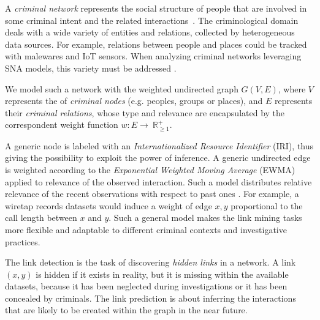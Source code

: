 

A \textit{criminal network} represents the social structure of people that are involved in some criminal intent and the related interactions~\cite{von2001organisierte}.
%
The criminological domain deals with a wide variety of entities and relations, collected by heterogeneous data sources. For example, relations between people and places could be tracked with malewares and IoT sensors. 
When analyzing criminal networks leveraging SNA models, this variety must be addressed \cite{pramanik2016framework}.

We model such a network with the weighted undirected graph $G(V,E)$, where  $ V$ represents the 
 of \textit{criminal nodes} (e.g. peoples, groups or places), and $E$ represents their \textit{criminal relations}, whose type and relevance are encapsulated by the correspondent weight function $w:E\rightarrow~\mathbb{R}_{\geq1}^{+}$. 

A generic node is labeled with an \textit{Internationalized Resource Identifier} (IRI), thus giving the possibility to exploit the power of inference. 
A generic undirected edge is weighted according to the \textit{Exponential Weighted Moving Average} (EWMA) applied to relevance of the observed interaction. 
Such a model distributes relative relevance of the recent observations with respect to past ones \cite{lucas1990exponentially}. 
For example, a wiretap records datasets would induce a weight of edge $x,y$ proportional to the call length between $x$ and $y$. 
Such a general model makes the link mining tasks more flexible and adaptable to different criminal contexts and investigative practices.


The link detection is the task of discovering \textit{hidden links} in a network. 
A link $(x,y)$ is hidden if it exists in reality, but it is missing within the available datasets, because it has been neglected during investigations or it has been concealed by criminals.
%
%
The link prediction is about inferring the interactions that are likely to be created within the graph in the near future. 
%


